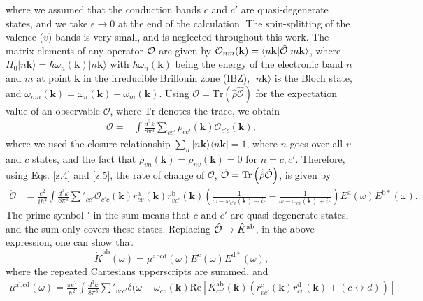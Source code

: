 \documentclass[floatfix,prb,aps,superscriptaddress,showpacs,11pt,preprint,letterpaper]{revtex4}
\begin{document}
where we assumed that the conduction bands $c$ and $c'$ are quasi-degenerate
states, and we take $\epsilon\to 0$ at the end of the calculation. The 
spin-splitting of the valence ($v$) bands is very small, and is neglected throughout
this work.\cite{nastosPRB07} The matrix elements of any operator ${\cal O}$ are
given by ${\cal O}_{nm}({\mathbf k})=\langle n{\mathbf k}|\hat{\cal O}|
m{\mathbf k}\rangle$, where $H_{0}|n{\mathbf k}\rangle = \hbar
\omega_{n}({\mathbf k})|n{\mathbf k}\rangle$ with $\hbar \omega_{n}({\mathbf
k})$ being the energy of the electronic band $n$ and $m$ at point ${\mathbf k}$ in the
irreducible Brillouin zone (IBZ),  $|n{\mathbf k}\rangle$ is the Bloch state,
and $\omega_{nm}({\mathbf k})=\omega_{n}({\mathbf k})-\omega_{m}({\mathbf k})$.
Using $\mathcal{O} = \mathrm{Tr}(\hat{\rho}\hat{\mathcal{O}})$ for the
expectation value of an observable $\mathcal{O}$, where $\mathrm{Tr}$ denotes
the trace, we obtain
\begin{align}\label{z.5}
\mathcal{O} = & 
\int \frac{d^{3}k}{8\pi^{3}} \sum_{cc'} \rho_{cc'}({\mathbf k}) 
\mathcal{O}_{c'c}({\mathbf k}),
\end{align}
where we used the closure relationship $\sum_{n}|n{\mathbf k}\rangle \langle
n{\mathbf k}| = 1$, where $n$ goes over all $v$ and $c$ states,
 and the fact that $\rho_{vn}(\mathbf{k})=\rho_{nv}({\mathbf k})=0$ for $n=c,c'$. Therefore, using  Eqs. \eqref{z.4}
and \eqref{z.5}, the rate of change of $\mathcal{O}$, $\dot{\mathcal{O}} =
\mathrm{Tr} \left( \dot{\hat\rho} \hat{\cal O} \right)$, is given by
\begin{align}
\dot{\mathcal{O}} 
&=\frac{e^{2}}{i\hbar^{2}} \int \frac{d^{3}k}{8\pi^{3}} 
\sum'_{cc'} \mathcal{O}_{c'c}({\mathbf k}) 
r^{\mathrm{a}}_{cv}({\mathbf k})  r^{\mathrm{b}}_{vc'}({\mathbf k})  
\left( \frac{1}{\omega - \omega_{c'v}({\mathbf k})  - i\epsilon} - 
\frac{1}{\omega - \omega_{cv}({\mathbf k})  + i\epsilon} \right)
E^{\mathrm{a}}(\omega) E^{\mathrm{b*}}(\omega)
\label{eq:dotO}
.
\end{align}
The prime symbol $'$ in the sum means that $c$ and $c'$ are quasi-degenerate
states, and the sum only covers these states. Replacing  $\hat{\cal O}
\rightarrow \hat{K}^{\mathrm{ab}}$, in the above expression, one can show that
\begin{equation}
\dot{K}^{\mathrm{ab}}(\omega) =
\mu^{\mathrm{abcd}}(\omega)
E^{\mathrm{c}}(\omega) E^{\mathrm{d*}}(\omega),
\label{eq:dotk}
\end{equation}
where the repeated Cartesians upperscripts  are summed, and 
\begin{equation}\label{eq:mu}
\begin{aligned}
\mu^{\mathrm{abcd}}  (\omega) 
=
\frac{\pi e^{2}}{\hbar^{2}} \int 
\frac{d^{3}k}{8 \pi^{3}} \sum'_{vcc'}
\delta(\omega-\omega_{cv}({\mathbf k}) 
\mathrm{Re} \left[ K^{\mathrm{ab}}_{cc'}({\mathbf k}) 
\left(  
r^{\mathrm{c}}_{vc'}({\mathbf k})   
r^{\mathrm{d}}_{cv }({\mathbf k})  +
(c \leftrightarrow d)  
\right) 
\right]
\end{aligned}
\end{equation} 
\end{document}
